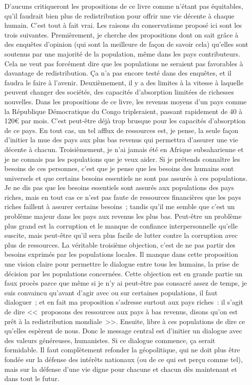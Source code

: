 \documentclass[a5paper,french]{memoir}
\begin{document}
D'aucuns critiqueront les propositions de ce livre comme n'étant pas équitables, qu'il faudrait bien plus de redistribution pour offrir une vie décente à chaque humain. C'est tout à fait vrai. Les raisons du conservatisme proposé ici sont les trois suivantes. Premièrement, je cherche des propositions dont on sait grâce à des enquêtes d'opinion (qui sont la meilleure de façon de savoir cela) qu'elles sont soutenus par une majorité de la population, même dans les pays contributeurs. Cela ne veut pas forcément dire que les populations ne seraient pas favorables à davantage de redistribution. Ça n'a pas encore testé dans des enquêtes, et il faudra le faire à l'avenir. Deuxièmement, il y a des limites à la vitesse à laquelle peuvent changer des sociétés, des capacités d'absorption limitées de richesses nouvelles. Dans les propositions de ce livre, les revenus moyens d'un pays comme la République Démocratique du Congo tripleraient, passant rapidement de 40 à 120\euro{} par mois. C'est peut-être déjà trop brusque pour les capacités d'absorption de ce pays. En tout cas, un tel afflux de ressources est, je pense, la seule façon d'initier la mue des pays aux plus bas revenus qui permettra d'assurer une vie décente à chacun. Troisièmement, je n'ai jamais été en Afrique subsaharienne et je ne connais pas les populations que je veux aider. Si je prétends connaître les besoins de ces personnes, c'est que je pense que les besoins des humains sont universels et que certains besoins essentiels ne sont pas assurés à ces populations. Je ne dis pas que les besoins essentiels sont assurés aux populations des pays riches, mais en tout cas ce n'est pas faute de ressources financières que les pays riches faillent à assurer certains besoins~; tandis qu'il me semble que c'est un problème majeur dans les pays aux revenus les plus bas. Peut-être un problème plus grand est la corruption et le manque de confiance interpersonnelle qu'elle suscite, mais peut-être qu'il sera plus facile de lutter contre la corruption avec plus de ressources. La véritable troisième objection, c'est de ne pas partir des besoins exprimés par les populations locales. Il manque dans cette proposition une vision claire pour permettre le dialogue entre tous les humains, la prise de décision par les populations concernées. Cette objection est en grande partie un faux procès parce que même si je n'y ai peut-être pas consacré assez de temps, je suis convaincu qu'avant d'agir avec ou sur certaines populations, il faut dialoguer~; et en fait ma proposition s'adresse surtout aux pays riches~: il s'agit de dire <<~proposons des ressources aux pays à bas revenus, disons qu'on est prêt à la redistribution mondiale~>>. Ensuite, libre à ces populations de dire ce qu'elles espèrent de nous. Donc le message central est d'initier un dialogue avec des valeurs généreuses, humanistes. Si ce dialogue commence, ça serait formidable. Il faut complètement refonder la géopolitique, qui ne doit plus être fondée sur la défense des intérêts nationaux (ou de ce qui est perçu comme tel), mais sur la défense d'une vie digne pour chacune et chacun dès maintenant et dans tout le futur. 
\end{document}
